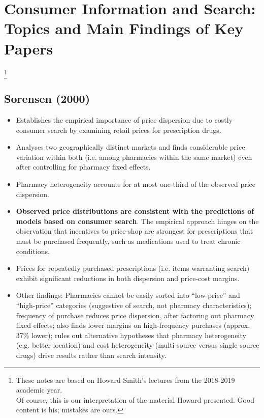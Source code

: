 \documentclass[11pt]{article}
\numberwithin{equation}{section}
\newcommand\blfootnote[1]{%
	\begingroup
	\renewcommand\thefootnote{}\footnote{#1}%
	\addtocounter{footnote}{-1}%
	\endgroup
}
\begin{document}
\section{Consumer Information and Search: Topics and Main Findings of Key Papers}\label{s1}
\blfootnote{These notes are based on Howard Smith's lectures from the 2018-2019 academic year.\\
Of course, this is our interpretation of the material Howard presented. Good content is his; mistakes are ours.}

\vspace{-1cm}
	\subsection*{Sorensen (2000)}
	\begin{itemize}
		\item Establishes the empirical importance of price dispersion due to costly consumer search by examining retail prices for prescription drugs.
		\item Analyses two geographically distinct markets and finds considerable price variation within both (i.e. among pharmacies within the same market) even after controlling for pharmacy fixed effects.
		\item Pharmacy heterogeneity accounts for at most one-third of the observed price dispersion.
		\item \textbf{Observed price distributions are consistent with the predictions of models based on consumer search}. The empirical approach hinges on the observation that incentives to price-shop are strongest for prescriptions that must be purchased frequently, such as medications used to treat chronic conditions.
		\item Prices for repeatedly purchased prescriptions (i.e. items warranting search) exhibit significant reductions in both dispersion and price-cost margins.
		\item Other findings: Pharmacies cannot be easily sorted into ``low-price'' and ``high-price'' categories (suggestive of search, not pharmacy characteristics); frequency of purchase reduces price dispersion, after factoring out pharmacy fixed effects; also finds lower margins on high-frequency purchases (approx. 37\% lower); rules out alternative hypotheses that pharmacy heterogeneity (e.g. better location) and cost heterogeneity (multi-source versus single-source drugs) drive results rather than search intensity.
	\end{itemize}
\end{document}
